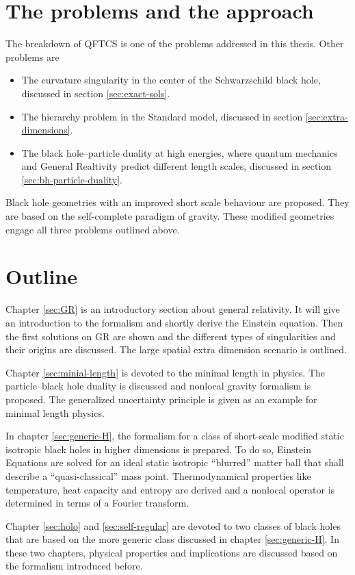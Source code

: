 \documentclass[12pt,a4paper]{report}
\numberwithin{equation}{chapter}
\begin{document}
\section{The problems and the approach}
The breakdown of QFTCS is one of the problems addressed in this thesis. Other problems are
\begin{itemize}
\item The curvature singularity in the center of the Schwarzschild black hole, discussed in section \ref{sec:exact-sols}.
\item The hierarchy problem in the Standard model, discussed in section \ref{sec:extra-dimensions}.
\item The black hole--particle duality at high energies, where quantum mechanics and General Realtivity predict different length scales, discussed in section \ref{sec:bh-particle-duality}.
\end{itemize}
Black hole geometries with an improved short scale behaviour are proposed. They are based on the self-complete paradigm of gravity. These modified geometries engage all three problems outlined above.

\section{Outline}
Chapter \ref{sec:GR} is an introductory section about general relativity. It will give an introduction to the formalism and shortly derive the Einstein equation. Then the first solutions on GR are shown and the different types of singularities and their origins are discussed.  The large spatial extra dimension scenario is outlined.

Chapter \ref{sec:minial-length} is devoted to the minimal length in physics. The particle--black hole duality is discussed and nonlocal gravity formalism is proposed. The generalized uncertainty principle is given as an example for minimal length physics.

In chapter \ref{sec:generic-H}, the formalism for a class of short-scale modified static isotropic black holes in higher dimensions is prepared. To do so, Einstein Equations are solved for an ideal static isotropic ``blurred'' matter ball that shall describe a ``quasi-classical'' mass point. Thermodynamical properties like temperature, heat capacity and entropy are derived and a nonlocal operator is determined in terms of a Fourier transform.

Chapter \ref{sec:holo} and \ref{sec:self-regular} are devoted to two classes of black holes that are based on the more generic class discussed in chapter \ref{sec:generic-H}. In these two chapters, physical properties and implications are discussed based on the formalism introduced before.
\end{document}
